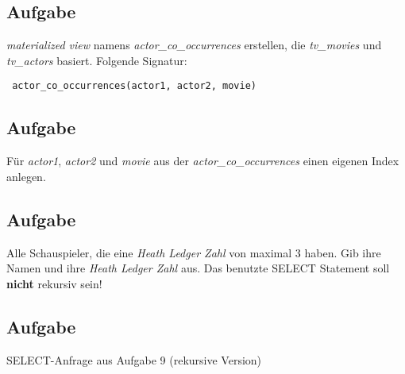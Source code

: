 \documentclass[11pt,a4paper,DIV=9]{scrartcl}
\newcounter{temp}
\newcommand{\aufgabe}[1]{
  \setcounter{temp}{\value{subsection}}
  \setcounter{subsection}{#1}
  \addtocounter{subsection}{-1}
  \subsection{Aufgabe}
  \setcounter{subsection}{\value{temp}}
}
\begin{document}
 \aufgabe{7}
 \textit{materialized view} namens \textit{actor\_co\_occurrences} erstellen, die \textit{tv\_movies} und  \textit{tv\_actors} basiert. Folgende Signatur: 
 \begin{lstlisting}
 actor_co_occurrences(actor1, actor2, movie)
 \end{lstlisting}
 \aufgabe{8}
 F\"ur \textit{actor1}, \textit{actor2} und \textit{movie} aus der \textit{actor\_co\_occurrences} einen eigenen Index anlegen.
 \aufgabe{9}
 Alle Schauspieler, die eine \textit{Heath Ledger Zahl} von maximal 3 haben. Gib ihre Namen und ihre \textit{Heath Ledger Zahl} aus. Das benutzte SELECT Statement soll \textbf{nicht} rekursiv sein!
 \aufgabe{10}
 SELECT-Anfrage aus Aufgabe 9 (rekursive Version)
\end{document}
